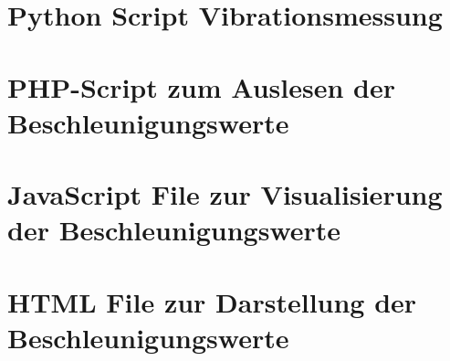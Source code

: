 \section{Python Script Vibrationsmessung}
\label{Python Script Vibrationsmessung}

\newpage

\section{PHP-Script zum Auslesen der Beschleunigungswerte}
\label{PHP-Script zum Auslesen der Beschleunigungswerte}

\newpage

\section{JavaScript File zur Visualisierung der Beschleunigungswerte}
\label{JavaScript File zur Visualisierung der Beschleunigungswerte}

\newpage

\section{HTML File zur Darstellung der Beschleunigungswerte}
\label{HTML File zur Darstellung der Beschleunigungswerte}

\newpage